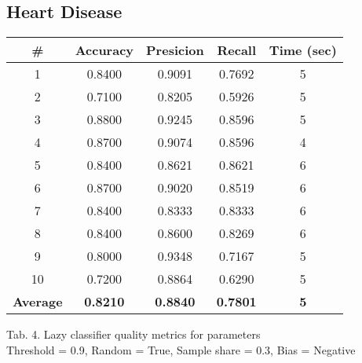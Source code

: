 \documentclass{article}
\begin{document}
\subsection{Heart Disease}

\begin{center}
    \begin{tabular}{|c|c|c|c|c|}
        \hline
        \# & \textbf{Accuracy} & \textbf{Presicion} & \textbf{Recall} & \textbf{Time (sec)} \\
        \hline
        1	& 0.8400	& 0.9091	& 0.7692	& 5 \\
        2	& 0.7100	& 0.8205	& 0.5926	& 5 \\
        3	& 0.8800	& 0.9245	& 0.8596	& 5 \\
        4	& 0.8700	& 0.9074	& 0.8596	& 4 \\
        5	& 0.8400	& 0.8621	& 0.8621	& 6 \\
        6	& 0.8700	& 0.9020	& 0.8519	& 6 \\
        7	& 0.8400	& 0.8333	& 0.8333	& 6 \\
        8	& 0.8400	& 0.8600	& 0.8269	& 6 \\
        9	& 0.8000	& 0.9348	& 0.7167	& 5 \\
        10	& 0.7200	& 0.8864	& 0.6290	& 5 \\
        \hline
        \textbf{Average} & \textbf{0.8210} & \textbf{0.8840} & \textbf{0.7801} & \textbf{5} \\
        \hline
    \end{tabular}
    
    Tab. 4. Lazy classifier quality metrics for parameters \\ Threshold = 0.9, Random = True, Sample share = 0.3, Bias = Negative
\end{center}
\end{document}
